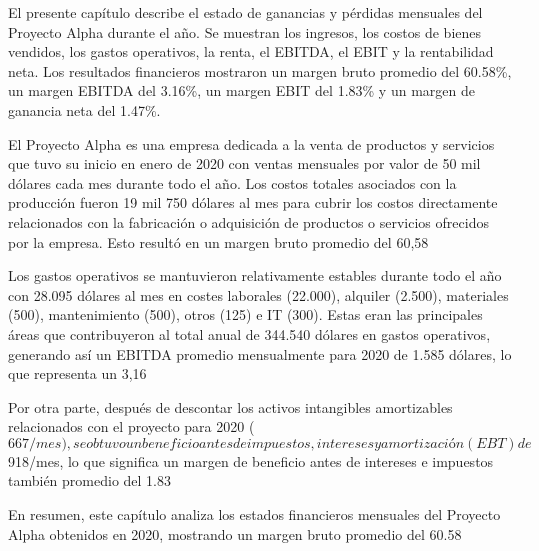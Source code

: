 
                El presente capítulo describe el estado de ganancias y pérdidas mensuales del Proyecto Alpha durante el año. Se muestran los ingresos, los costos de bienes vendidos, los gastos operativos, la renta, el EBITDA, el EBIT y la rentabilidad neta. Los resultados financieros mostraron un margen bruto promedio del 60.58\%, un margen EBITDA del 3.16\%, un margen EBIT del 1.83\% y un margen de ganancia neta del 1.47\%.

                El Proyecto Alpha es una empresa dedicada a la venta de productos y servicios que tuvo su inicio en enero de 2020 con ventas mensuales por valor de 50 mil dólares cada mes durante todo el año. Los costos totales asociados con la producción fueron 19 mil 750 dólares al mes para cubrir los costos directamente relacionados con la fabricación o adquisición de productos o servicios ofrecidos por la empresa. Esto resultó en un margen bruto promedio del 60,58%

                Los gastos operativos se mantuvieron relativamente estables durante todo el año con 28.095 dólares al mes en costes laborales (22.000), alquiler (2.500), materiales (500), mantenimiento (500), otros (125) e IT (300). Estas eran las principales áreas que contribuyeron al total anual de 344.540 dólares en gastos operativos, generando así un EBITDA promedio mensualmente para 2020 de 1.585 dólares, lo que representa un 3,16 %

                Por otra parte, después de descontar los activos intangibles amortizables relacionados con el proyecto para 2020 ($667/mes), se obtuvo un beneficio antes de impuestos, intereses y amortización (EBT) de $918/mes, lo que significa un margen de beneficio antes de intereses e impuestos también promedio del 1.83%

                En resumen, este capítulo analiza los estados financieros mensuales del Proyecto Alpha obtenidos en 2020, mostrando un margen bruto promedio del 60.58%
